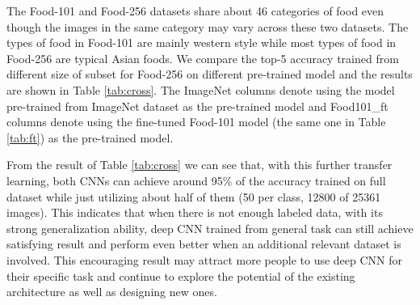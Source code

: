 The Food-101 and Food-256 datasets share about 46 categories of food even though the images in the same category may vary across these two datasets. The types of food in Food-101 are mainly western style while most types of food in Food-256 are typical Asian foods. We compare the top-5 accuracy trained from different size of subset for Food-256 on different pre-trained model and the results are shown in Table \ref{tab:cross}.
The ImageNet columns denote using the model pre-trained from ImageNet dataset as the pre-trained model and Food101\_ft columns denote using the fine-tuned Food-101 model (the same one in Table \ref{tab:ft}) as the pre-trained model.

From the result of Table \ref{tab:cross} we can see that, with this further transfer learning, both CNNs can achieve around 95\% of the accuracy trained on full dataset while just utilizing about half of them (50 per class, 12800 of 25361 images). This indicates that when there is not enough labeled data, with its strong generalization ability, deep CNN trained from general task can still achieve satisfying result and perform even better when an additional relevant dataset is involved. This encouraging result may attract more people to use deep CNN for their specific task and continue to explore the potential of the existing architecture as well as designing new ones.


